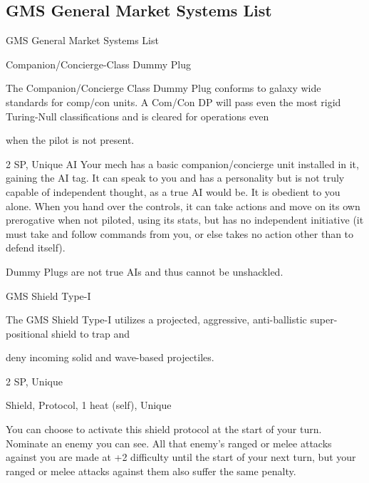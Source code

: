 \subsection{GMS General Market Systems List}
                                GMS General Market Systems List  

Companion/Concierge-Class Dummy Plug  

The Companion/Concierge Class Dummy Plug conforms to galaxy wide standards for comp/con units. A  
Com/Con DP will pass even the most rigid Turing-Null classifications and is cleared for operations even  

when the pilot is not present.   

2 SP, Unique  
AI  
Your mech has a basic companion/concierge unit installed in it, gaining the AI tag. It can speak  
to you and has a personality but is not truly capable of independent thought, as a true AI would  
be. It is obedient to you alone. When you hand over the controls, it can take actions and move  
on its own prerogative when not piloted, using its stats, but has no independent initiative (it must  
take and follow commands from you, or else takes no action other than to defend itself).
 

Dummy Plugs are not true AIs and thus cannot be unshackled.
 

GMS Shield Type-I  

The GMS Shield Type-I utilizes a projected, aggressive, anti-ballistic super-positional shield to trap and  

deny incoming solid and wave-based projectiles.   
   

2 SP, Unique
 
Shield, Protocol, 1 heat (self), Unique
 

                                                                                                                       


You can choose to activate this shield protocol at the start of your turn. Nominate an enemy you  
can see. All that enemy’s ranged or melee attacks against you are made at +2 difficulty until the  
start of your next turn, but your ranged or melee attacks against them also suffer the same  
penalty.
